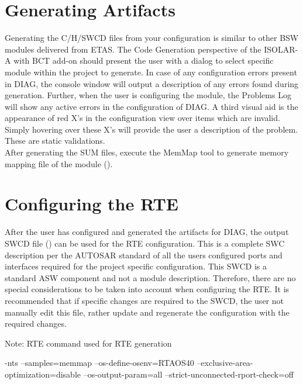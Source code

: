 \section{Generating Artifacts}
\label{sec:Artifacts}
Generating the C/H/SWCD files from your configuration is similar to other BSW modules delivered from ETAS.
The Code Generation perspective of the 
\ifnum {}
\else
{ISOLAR-A with BCT add-on}
\fi
should present the user with a dialog to select specific module within the project to generate.
\ifnum {}
\fi
In case of any configuration errors present in DIAG, the console window will output a description of any errors found during generation.
Further, when the user is configuring the module, the Problems Log will show any active errors in the configuration of DIAG.
A third visual aid is the appearance of red X’s in the configuration view over items which are invalid.
Simply hovering over these X’s will provide the user a description of the problem.
These are static validations. \\

After generating the SUM files, execute the MemMap tool to generate memory mapping file of the module ().

\section{Configuring the RTE}
After the user has configured and generated the artifacts for DIAG, the output SWCD file \linebreak() can be used for the RTE configuration.
This is a complete SWC description per the AUTOSAR standard of all the users configured ports and interfaces required for the project specific configuration.
This SWCD is a standard ASW component and not a module description.
Therefore, there are no special considerations to be taken into account when configuring the RTE.
It is recommended that if specific changes are required to the SWCD, the user not manually edit this file, rather update and regenerate the configuration with the required changes.

Note: RTE command used for RTE generation

\begin{rtecommandline}
	-nts --samples=memmap --os-define-osenv=RTAOS40 --exclusive-area-optimization=disable --os-output-param=all --strict-unconnected-rport-check=off
\end{rtecommandline}

